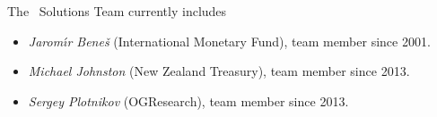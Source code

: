
\bigskip
\bigskip

The \iris\ Solutions Team currently includes

\begin{itemize}

\item \textit{Jarom\'\i r Bene\v s} (International Monetary Fund), team member since 2001.

\item \textit{Michael Johnston} (New Zealand Treasury), team member since 2013.

\item \textit{Sergey Plotnikov} (OGResearch), team member since 2013.

\end{itemize}